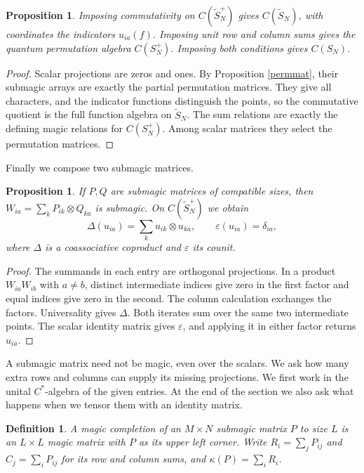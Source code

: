 \documentclass[11pt,a4paper]{article}
\newtheorem{prop}[thm]{Proposition}
\newtheorem{defn}[thm]{Definition}
\begin{document}
\begin{prop}
Imposing commutativity on $C(\widetilde S_N^+)$ gives $C(\widetilde S_N)$, with coordinates the indicators $u_{ia}(f)$. Imposing unit row and column sums gives the quantum permutation algebra $C(S_N^+)$. Imposing both conditions gives $C(S_N)$.
\end{prop}
\begin{proof}
Scalar projections are zeros and ones. By Proposition \ref{permmat}, their submagic arrays are exactly the partial permutation matrices. They give all characters, and the indicator functions distinguish the points, so the commutative quotient is the full function algebra on $\widetilde S_N$. The sum relations are exactly the defining magic relations for $C(S_N^+)$. Among scalar matrices they select the permutation matrices.
\end{proof}

Finally we compose two submagic matrices.

\begin{prop}\label{tensorcompose}
If $P,Q$ are submagic matrices of compatible sizes, then $W_{ia}=\sum_k P_{ik}\otimes Q_{ka}$ is submagic. On $C(\widetilde S_N^+)$ we obtain
\[
 \Delta(u_{ia})=\sum_k u_{ik}\otimes u_{ka},\qquad
 \varepsilon(u_{ia})=\delta_{ia},
\]
where $\Delta$ is a coassociative coproduct and $\varepsilon$ its counit.
\end{prop}
\begin{proof}
The summands in each entry are orthogonal projections. In a product $W_{ia}W_{ib}$ with $a\ne b$, distinct intermediate indices give zero in the first factor and equal indices give zero in the second. The column calculation exchanges the factors. Universality gives $\Delta$. Both iterates sum over the same two intermediate points. The scalar identity matrix gives $\varepsilon$, and applying it in either factor returns $u_{ia}$.
\end{proof}

A submagic matrix need not be magic, even over the scalars. We ask how many extra rows and columns can supply its missing projections. We first work in the unital $C^*$-algebra of the given entries. At the end of the section we also ask what happens when we tensor them with an identity matrix.

\begin{defn}
A magic completion of an $M\times N$ submagic matrix $P$ to size $L$ is an $L\times L$ magic matrix with $P$ as its upper left corner. Write $R_i=\sum_jP_{ij}$ and $C_j=\sum_iP_{ij}$ for its row and column sums, and $\kappa(P)=\sum_iR_i$.
\end{defn}
\end{document}
